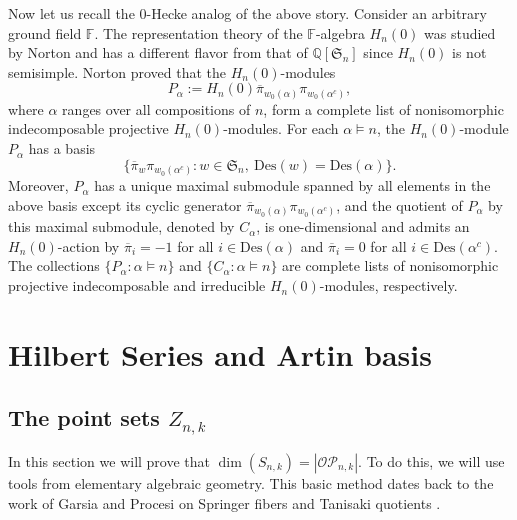 \documentclass[10pt]{amsart}
\theoremstyle{definition}
\newcommand{\Des}{{\mathrm {Des}}}
\newcommand{\symm}{{\mathfrak{S}}}
\newcommand{\QQ}{{\mathbb {Q}}}
\newcommand{\OP}{{\mathcal{OP}}}
\newcommand{\FF}{{\mathbb{F}}}
\newcommand{\pib}{\overline{\pi}}
\begin{document}
Now let us recall the 0-Hecke analog of the above story.
Consider an arbitrary ground field $\FF$.
The representation theory of the $\FF$-algebra $H_n(0)$ was studied by Norton \cite{Norton}
and has a different flavor from that of $\QQ[\symm_n]$ since $H_n(0)$ is not semisimple.
Norton \cite{Norton} proved that %
the $H_n(0)$-modules 
\begin{equation}
P_{\alpha} := H_n(0) \pib_{w_0(\alpha)} \pi_{w_0(\alpha^c)},
\end{equation}
where $\alpha$ ranges over all compositions of $n$, form a complete list of nonisomorphic
 indecomposable projective 
$H_n(0)$-modules.  
For each $\alpha\models n$, the $H_n(0)$-module $P_\alpha$ has a basis 
\[ \{ \pib_w \pi_{w_0(\alpha^c)} : w\in\symm_n,\ \Des(w) = \Des(\alpha) \}. \]
Moreover, $P_\alpha$ has a unique maximal submodule spanned by all elements in the above basis except its cyclic generator $\pib_{w_0(\alpha)} \pi_{w_0(\alpha^c)}$, and the quotient of $P_\alpha$ by this maximal submodule, denoted by $C_\alpha$, is one-dimensional and admits an $H_n(0)$-action by $\pib_i = -1$ for all $i\in \Des(\alpha)$ and $\pib_i = 0$ for all $i\in \Des(\alpha^c)$. 
The collections $\{ P_\alpha:\alpha\models n\}$ and $\{ C_\alpha: \alpha\models n\}$ are complete lists of nonisomorphic projective indecomposable and irreducible $H_n(0)$-modules, respectively.

\section{Hilbert Series and Artin basis}
\label{Hilbert}


\subsection{The point sets $Z_{n,k}$}
In this section we will prove that $\dim(S_{n,k}) = |\OP_{n,k}|$.
To do this, we will use tools from elementary algebraic geometry.
This basic method dates back to the work of Garsia and Procesi on Springer
fibers and Tanisaki quotients \cite{GP}.
\end{document}
